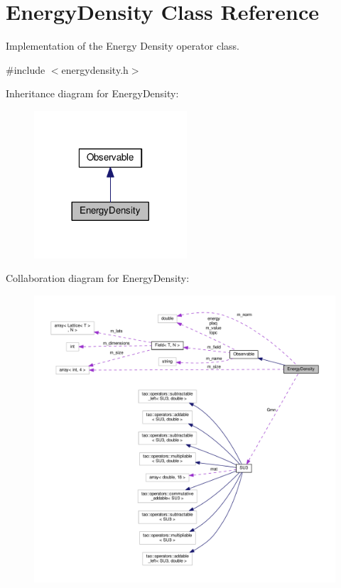 \hypertarget{classEnergyDensity}{}\section{Energy\+Density Class Reference}
\label{classEnergyDensity}


Implementation of the Energy Density operator class.  




{\ttfamily \#include $<$energydensity.\+h$>$}



Inheritance diagram for Energy\+Density\+:\nopagebreak
\begin{figure}[H]
\begin{center}
\leavevmode
\includegraphics[width=161pt]{d2/d7e/classEnergyDensity__inherit__graph}
\end{center}
\end{figure}


Collaboration diagram for Energy\+Density\+:\nopagebreak
\begin{figure}[H]
\begin{center}
\leavevmode
\includegraphics[width=350pt]{d5/d62/classEnergyDensity__coll__graph}
\end{center}
\end{figure}
